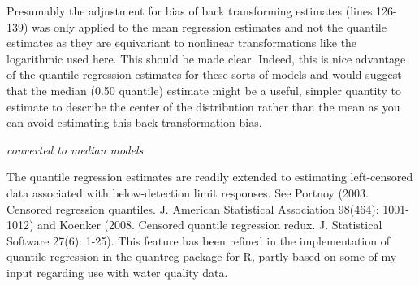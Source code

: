 \documentclass[letterpaper,12pt,oneside]{article}\usepackage[]{graphicx}\usepackage[]{color}
\begin{document}
Presumably the adjustment for bias of back transforming estimates (lines 126-139) was only applied to the mean regression estimates and not the quantile estimates as they are equivariant to nonlinear transformations like the logarithmic used here.  This should be made clear.  Indeed, this is nice advantage of the quantile regression estimates for these sorts of models and would suggest that the median (0.50 quantile) estimate might be a useful, simpler quantity to estimate to describe the center of the distribution rather than the mean as you can avoid estimating this back-transformation bias.

{\it converted to median models}

The quantile regression estimates are readily extended to estimating left-censored data associated with below-detection limit responses.  See Portnoy (2003.  Censored regression quantiles. J. American Statistical Association 98(464): 1001-1012) and Koenker (2008.  Censored quantile regression redux.  J. Statistical Software 27(6): 1-25).  This feature has been refined in the implementation of quantile regression in the quantreg package for R, partly based on some of my input regarding use with water quality data. 
\end{document}
